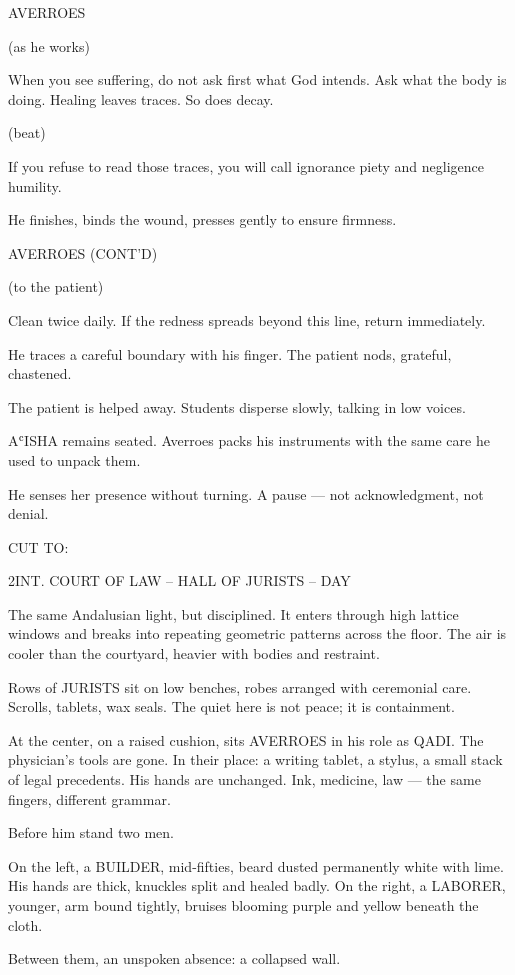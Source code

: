 \documentclass[12pt]{article}
\newlength{\charindent}
\newlength{\dialogueindent}
\newlength{\dialoguewidth}
\newlength{\transitionindent}
\newlength{\parentheticalindent}
\newcommand{\slug}[1]{%
  \needspace{4\baselineskip}%
  \vspace{1.5em}%
  \noindent\MakeUppercase{#1}%
  \nopagebreak[4]%
  \par\vspace{0.75em}%
}
\newcommand{\action}[1]{%
  \noindent#1\par\vspace{0.75em}%
}
\newcommand{\character}[1]{%
  \needspace{3\baselineskip}%
  \par\vspace{0.5em}%
  \noindent\hspace*{\charindent}\MakeUppercase{#1}\nopagebreak[4]%
}
\newcommand{\parenthetical}[1]{%
  \par\nobreak\nopagebreak[4]%
  \noindent\hspace*{\parentheticalindent}(#1)%
}
\newcommand{\dialogue}[1]{%
  \par\nobreak\nopagebreak[4]%
  \noindent\hspace*{\dialogueindent}%
  \begin{minipage}[t]{\dialoguewidth}
  #1
  \end{minipage}%
  \par\vspace{0.5em}%
}
\newcommand{\transition}[1]{%
  \needspace{2\baselineskip}%
  \par\vspace{1em}%
  \noindent\hspace*{\transitionindent}\MakeUppercase{#1}%
  \par%
}
\newcommand{\contd}{\textsc{(cont'd)}}
\newcommand{\beat}{\parenthetical{beat}}
\begin{document}
\character{AVERROES}
\parenthetical{as he works}
\dialogue{When you see suffering, do not ask first what God intends. Ask what the body is doing. Healing leaves traces. So does decay.}

\beat

\dialogue{If you refuse to read those traces, you will call ignorance piety and negligence humility.}

\action{He finishes, binds the wound, presses gently to ensure firmness.}

\character{AVERROES \contd}
\parenthetical{to the patient}
\dialogue{Clean twice daily. If the redness spreads beyond this line, return immediately.}

\action{He traces a careful boundary with his finger. The patient nods, grateful, chastened.}

\action{The patient is helped away. Students disperse slowly, talking in low voices.}

\action{AʿISHA remains seated. Averroes packs his instruments with the same care he used to unpack them.}

\action{He senses her presence without turning. A pause — not acknowledgment, not denial.}

\transition{CUT TO:}

\slug{2\quad INT. COURT OF LAW -- HALL OF JURISTS -- DAY}

\action{The same Andalusian light, but disciplined. It enters through high lattice windows and breaks into repeating geometric patterns across the floor. The air is cooler than the courtyard, heavier with bodies and restraint.}

\action{Rows of JURISTS sit on low benches, robes arranged with ceremonial care. Scrolls, tablets, wax seals. The quiet here is not peace; it is containment.}

\action{At the center, on a raised cushion, sits AVERROES in his role as QADI. The physician’s tools are gone. In their place: a writing tablet, a stylus, a small stack of legal precedents. His hands are unchanged. Ink, medicine, law — the same fingers, different grammar.}

\action{Before him stand two men.}

\action{On the left, a BUILDER, mid-fifties, beard dusted permanently white with lime. His hands are thick, knuckles split and healed badly. On the right, a LABORER, younger, arm bound tightly, bruises blooming purple and yellow beneath the cloth.}

\action{Between them, an unspoken absence: a collapsed wall.}
\end{document}
